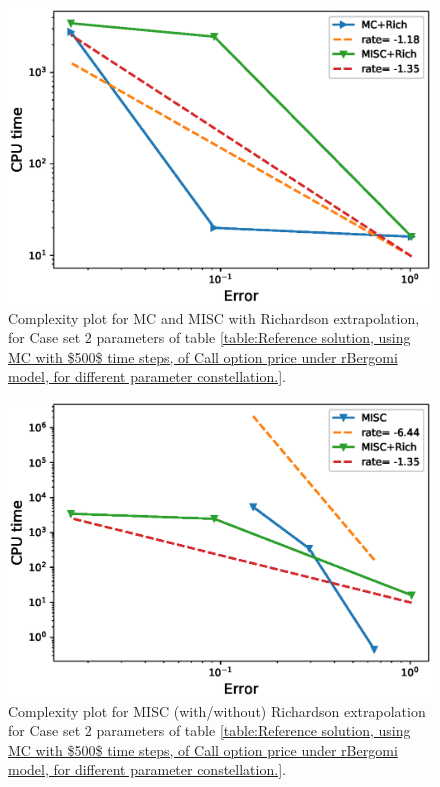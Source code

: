 \documentclass[11pt]{article}
\begin{document}
\begin{figure}[h!]
	\centering
	\includegraphics[width=0.7\linewidth]{./figures/rBergomi_Complexity_rates/set2/error_vs_time_set2_rich}
	
	\caption{Complexity plot for  MC and MISC with Richardson extrapolation, for Case set $2$ parameters of table \ref{table:Reference solution, using MC with $500$ time steps, of Call option price under rBergomi model, for different parameter constellation.}.}
	\label{fig:Complexity plot for MC and MISC for Case set $2$ parameters, richardson}
\end{figure}


\begin{figure}[h!]
	\centering
	\includegraphics[width=0.7\linewidth]{./figures/rBergomi_Complexity_rates/set2/error_vs_time_set2_comparison}
	
	\caption{Complexity plot for  MISC (with/without) Richardson extrapolation for Case set $2$ parameters of table \ref{table:Reference solution, using MC with $500$ time steps, of Call option price under rBergomi model, for different parameter constellation.}.}
	\label{fig:Complexity plot for  MISC for Case set $2$ parameters, comparison}
\end{figure}

\FloatBarrier
\end{document}
